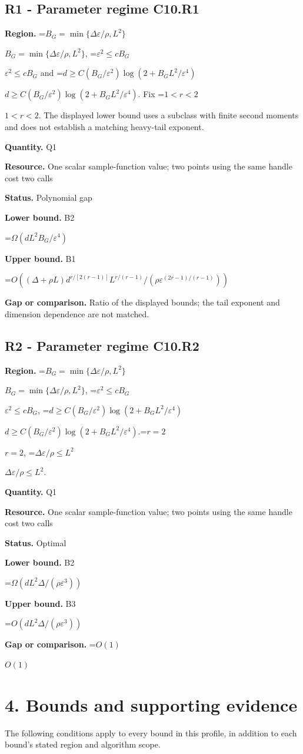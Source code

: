 \documentclass[10pt,a4paper]{article}
\newcommand{\AtlasMath}[1]{\par\begingroup\centering\setbox0=\hbox{$\displaystyle #1$}\ifdim\wd0>1.4\linewidth\typeout{ATLAS WIDE FORMULA: \the\wd0}\fi\ifdim\wd0>\linewidth\resizebox{\linewidth}{!}{\box0}\else\box0\fi\par\endgroup}
\newcommand{\AtlasInlineMath}[1]{\begingroup\setbox0=\hbox{$#1$}\ifdim\wd0>.4\linewidth\endgroup\AtlasMath{#1}\else\endgroup$#1$\fi}
\begin{document}
\subsection{R1 - Parameter regime C10.R1}
\textbf{Region.} \AtlasInlineMath{B_G=\min\{\Delta\varepsilon/\rho,L^2\}}, \AtlasInlineMath{\varepsilon^2\le cB_G} and \AtlasInlineMath{d\ge C(B_G/\varepsilon^2)\log(2+B_GL^2/\varepsilon^4)}. Fix \AtlasInlineMath{1<r<2}. The displayed lower bound uses a subclass with finite second moments and does not establish a matching heavy-tail exponent.

\textbf{Quantity.} Q1

\textbf{Resource.} One scalar sample-function value; two points using the same handle cost two calls

\textbf{Status.} Polynomial gap

\textbf{Lower bound.} B2

\AtlasMath{\Omega(dL^2B_G/\varepsilon^4)}
\textbf{Upper bound.} B1

\AtlasMath{O((\Delta+\rho L)d^{r/[2(r-1)]}L^{r/(r-1)}/(\rho\varepsilon^{(2r-1)/(r-1)}))}
\textbf{Gap or comparison.} Ratio of the displayed bounds; the tail exponent and dimension dependence are not matched.

\subsection{R2 - Parameter regime C10.R2}
\textbf{Region.} \AtlasInlineMath{B_G=\min\{\Delta\varepsilon/\rho,L^2\}}, \AtlasInlineMath{\varepsilon^2\le cB_G}, \AtlasInlineMath{d\ge C(B_G/\varepsilon^2)\log(2+B_GL^2/\varepsilon^4)}.\AtlasInlineMath{r=2}, \AtlasInlineMath{\Delta\varepsilon/\rho\le L^2}.

\textbf{Quantity.} Q1

\textbf{Resource.} One scalar sample-function value; two points using the same handle cost two calls

\textbf{Status.} Optimal

\textbf{Lower bound.} B2

\AtlasMath{\Omega(dL^2\Delta/(\rho\varepsilon^3))}
\textbf{Upper bound.} B3

\AtlasMath{O(dL^2\Delta/(\rho\varepsilon^3))}
\textbf{Gap or comparison.} \AtlasInlineMath{O(1)}

\section{4. Bounds and supporting evidence}
The following conditions apply to every bound in this profile, in addition to each bound's stated region and algorithm scope.
\end{document}
